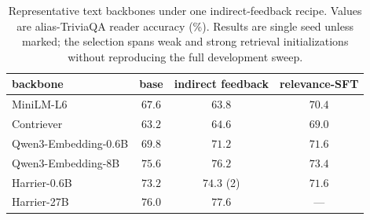 \begin{table}[H]
\centering\small
\caption{Representative text backbones under one indirect-feedback recipe. Values are
alias-TriviaQA reader accuracy (\%). Results are single seed unless marked; the selection spans weak
and strong retrieval initializations without reproducing the full development sweep.}
\label{tab:rag_backbone}
\begin{tabular}{lccc}
\toprule
backbone & base & indirect feedback & relevance-SFT \\
\midrule
MiniLM-L6 & $67.6$ & $63.8$ & $70.4$ \\
Contriever & $63.2$ & $64.6$ & $69.0$ \\
Qwen3-Embedding-0.6B & $69.8$ & $71.2$ & $71.6$ \\
Qwen3-Embedding-8B & $75.6$ & $76.2$ & $73.4$ \\
Harrier-0.6B & $73.2$ & $74.3$ (2) & $71.6$ \\
Harrier-27B & $76.0$ & $77.6$ & --- \\
\bottomrule
\end{tabular}
\end{table}
